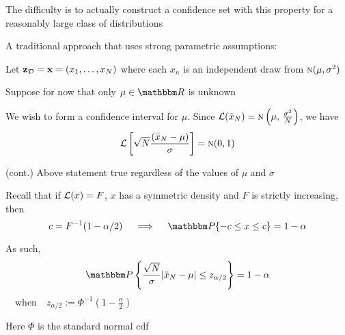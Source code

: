 \begin{frame}

    \vspace{2em}
    The difficulty is to actually construct a confidence set with this
    property for a reasonably large class of distributions
    
    A traditional approach that uses strong parametric assumptions:

    \vspace{.7em}
    \Eg
    Let $\mathbf{z}_{\mathcal D} = {\mathbf x} = (x_1,\ldots,x_N)$ where each $x_n$ is an
    independent draw from $\textrm{\sc n}(\mu, \sigma^2)$
    
    Suppose for now that 
    only $\mu \in \RR$ is unknown
    
    We wish to form a confidence
    interval for $\mu$.  Since $\mathcal L(\bar x_N) 
        = \textrm{\sc n} \left(\mu, \, \frac{\sigma^2}{N} \right)$, we have
    \begin{equation}
        \label{eq:cisk}
        \mathcal L \left[
            \sqrt N \frac{(\bar x_N - \mu)}{\sigma}  
        \right]
        = \textrm{\sc n}(0, 1)
    \end{equation}
    
\end{frame}

\begin{frame}
    
    \vspace{2em}
    \Eg (cont.)
    Above statement true regardless of the values of $\mu$ and
    $\sigma$
    
    Recall that if $\mathcal L(x) = F$, $x$ has a symmetric density and $F$
    is strictly increasing, then 
    \begin{equation*}
    \label{eq:symcdf}
        c = F^{-1}(1 - \alpha/2) 
        \quad \implies \quad
        \PP\{-c \leq x \leq c\} = 1 - \alpha
    \end{equation*}

    As such, 
    \begin{equation*}
        \PP
            \left\{ 
            \frac{\sqrt{N}}{\sigma} | \bar x_N - \mu | 
            \leq z_{\alpha/2}
            \right\}
        = 1 - \alpha
    \end{equation*}
    $\quad \text{when} \quad
        z_{\alpha/2} := \Phi^{-1} \left(1 - \frac{\alpha}{2} \right)$
        
    Here $\Phi$ is the standard normal {\sc cdf}

\end{frame}

